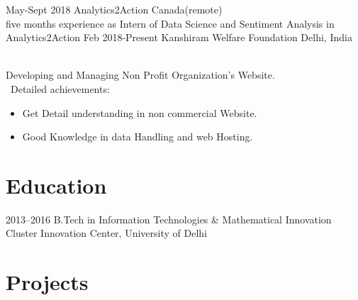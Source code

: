 \documentclass[]{cv-style}          %
\begin{document}
\begin{entrylist}
\entry
  {May-Sept 2018}
  {Analytics2Action}
  {Canada(remote)}
  {\\
  five months experience as Intern of Data Science  and Sentiment Analysis in Analytics2Action}
\entry
  {Feb 2018-Present}
  {Kanshiram Welfare Foundation}
  {Delhi, India}
  {\\
  Developing and Managing Non Profit Organization's Website. \\\
  Detailed achievements:
  \begin{itemize}
    \item Get Detail understanding in non commercial Website.
     
     \item Good Knowledge in data Handling and web Hosting.
     
     
  \end{itemize}}

\end{entrylist}


\section{Education}

\begin{entrylist}
\entry
{2013--2016}
{B.Tech {\normalfont in Information Technologies \& Mathematical Innovation}}
{Cluster Innovation Center, University of Delhi}


\end{entrylist}


\section{Projects}
\end{document}
